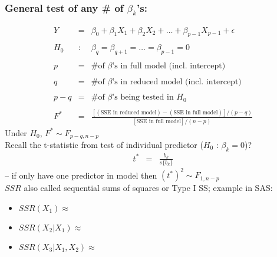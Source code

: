 \documentclass[12pt]{notes}
\begin{document}
\subsubsection*{General test of any \# of $\beta_k$'s:}
\begin{eqnarray}
  Y & = & \beta_0 + \beta_1 X_1 + \beta_2 X_2 + \ldots + \beta_{p-1} X_{p-1} + \epsilon
  \nonumber \\
  & \nonumber \\
  H_0 & : & \beta_q = \beta_{q+1} = \ldots = \beta_{p-1} = 0   \nonumber \\
  & \nonumber \\
  p & = & \mbox{\# of $\beta$'s in full model (incl. intercept)} \nonumber\\
  & \nonumber \\
  q & = & \mbox{\# of $\beta$'s in reduced model (incl. intercept)} \nonumber\\
  & \nonumber \\
  p - q & = & \mbox{\# of $\beta$'s being tested in $H_0$} \nonumber \\
  & \nonumber \\
  F^* & = & \frac{[(\mbox{SSE in reduced model})-(\mbox{SSE in full model})] / (p-q)}{ [\mbox{SSE in full model}] /
  (n-p)} \nonumber
\end{eqnarray}
Under $H_0$, $F^* \sim F_{p-q,n-p}$\\


Recall the t-statistic from test of individual
predictor ($H_0$ : $\beta_k = 0$)?
\begin{eqnarray}
   t^* & = & \frac{b_k}{s\{ b_k \}} \nonumber
\end{eqnarray}
-- if only have one predictor in model then $(t^*)^2 \sim F_{1, n-p}$\\


$SSR$ also called sequential sums of squares or Type I SS; example
in SAS:
\begin{itemize}
  \item $SSR(X_1) \approx $%
  \item $SSR(X_2 | X_1) \approx $%
  \item $SSR(X_3 | X_1, X_2) \approx $%
\end{itemize}

\vspace{.5em}

\end{document}
